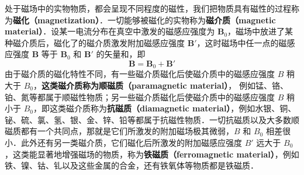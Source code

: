 
处于磁场中的实物物质，都会呈现不同程度的磁性，我们把物质具有磁性的过程称为\textbf{磁化（magnetization）}．一切能够被磁化的实物称为\textbf{磁介质（magnetic material）}．设某一电流分布在真空中激发的磁感应强度为 $\mathbf B_0$，磁场中放进了某种磁介质后，磁化了的磁介质激发附加磁感应强度 $\mathbf B'$，这时磁场中任一点的磁感应强度 $\mathbf B $ 等于 $\mathbf B_0$ 和 $\mathbf B'$ 的矢量和，即
\begin{equation}
\mathbf B=\mathbf B_0+\mathbf B'
\end{equation}
由于磁介质的磁化特性不同，有一些磁介质磁化后使磁介质中的磁感应强度 $B$ 稍大于 $B_0$，\textbf{这类磁介质称为顺磁质（paramagnetic material）}， 例如锰、铬、铂、氮等都属于顺磁性物质；另一些磁介质磁化后使磁介质中的磁感应强度 $B$ 稍小于 $B_0$，即这类磁介质称为\textbf{抗磁质（diamagnetic material）}，例如水银、铜、铋、硫、氯、氢、银、金、锌、铅等都属于抗磁性物质．一切抗磁质以及大多数顺磁质都有一个共同点，那就是它们所激发的附加磁场极其微弱，$B$ 和 $B_0$ 相差很小．此外还有另一类磁介质，它们磁化后所激发的附加磁感应强度 $B'$ 远大于 $B_0$，这类能显著地增强磁场的物质，称为\textbf{铁磁质（ferromagnetic material）}，例如铁、镍、钴、钆以及这些金属的合金，还有铁氧体等物质都是铁磁质．